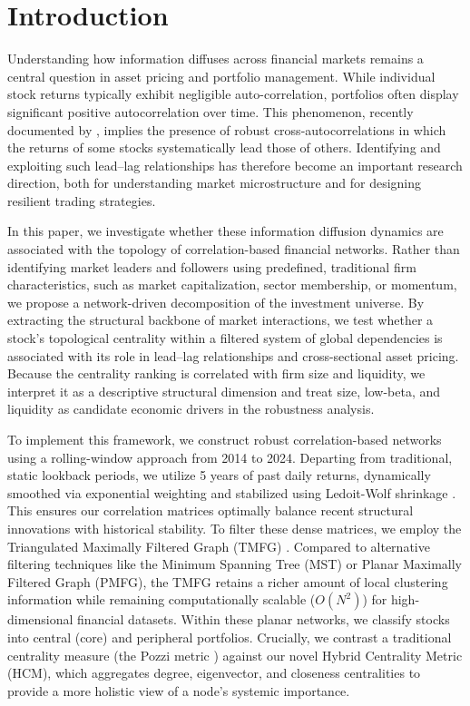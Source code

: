 \documentclass[fleqn]{rbfin}
\begin{document}

\section{Introduction}

\noindent Understanding how information diffuses across financial markets remains a central question in asset pricing and portfolio management. While individual stock returns typically exhibit negligible auto-correlation, portfolios often display significant positive autocorrelation over time. This phenomenon, recently documented by \citet{li2022detecting}, implies the presence of robust cross-autocorrelations in which the returns of some stocks systematically lead those of others. Identifying and exploiting such lead--lag relationships has therefore become an important research direction, both for understanding market microstructure and for designing resilient trading strategies.

In this paper, we investigate whether these information diffusion dynamics are associated with the topology of correlation-based financial networks. Rather than identifying market leaders and followers using predefined, traditional firm characteristics, such as market capitalization, sector membership, or momentum, we propose a network-driven decomposition of the investment universe. By extracting the structural backbone of market interactions, we test whether a stock's topological centrality within a filtered system of global dependencies is associated with its role in lead--lag relationships and cross-sectional asset pricing. Because the centrality ranking is correlated with firm size and liquidity, we interpret it as a descriptive structural dimension and treat size, low-beta, and liquidity as candidate economic drivers in the robustness analysis.

To implement this framework, we construct robust correlation-based networks using a rolling-window approach from 2014 to 2024. Departing from traditional, static lookback periods, we utilize 5 years of past daily returns, dynamically smoothed via exponential weighting and stabilized using Ledoit-Wolf shrinkage \cite{ledoit2004honey}. This ensures our correlation matrices optimally balance recent structural innovations with historical stability. To filter these dense matrices, we employ the Triangulated Maximally Filtered Graph (TMFG) \cite{massara2016network}. Compared to alternative filtering techniques like the Minimum Spanning Tree (MST) or Planar Maximally Filtered Graph (PMFG), the TMFG retains a richer amount of local clustering information while remaining computationally scalable ($O(N^2)$) for high-dimensional financial datasets. Within these planar networks, we classify stocks into central (core) and peripheral portfolios. Crucially, we contrast a traditional centrality measure (the Pozzi metric \citet{pozzi2013spread}) against our novel Hybrid Centrality Metric (HCM), which aggregates degree, eigenvector, and closeness centralities to provide a more holistic view of a node's systemic importance.
\end{document}
